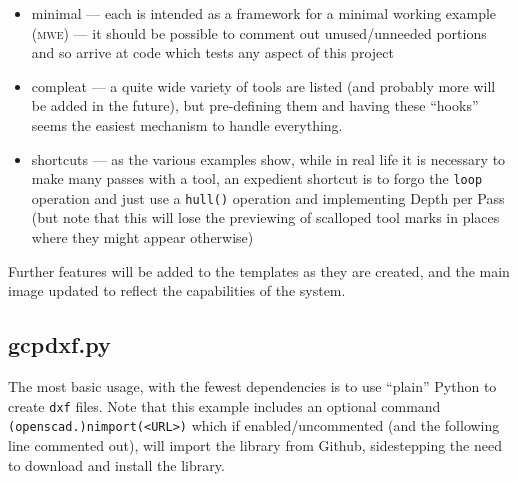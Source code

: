 \documentclass{ltxdoc}
\begin{document}
\begin{itemize}
\item minimal --- each is intended as a framework for a minimal working example (\textsc{mwe}) --- it should be possible to comment out unused/unneeded portions and so arrive at code which tests any aspect of this project
\item compleat --- a quite wide variety of tools are listed (and probably more will be
                   added in the future), but pre-defining them and having these ``hooks''
                   seems the easiest mechanism to handle everything. 
\item shortcuts --- as the various examples show, while in real life it is necessary to 
                    make many passes with a tool, an expedient shortcut is to forgo the 
                    \verb|loop| operation and just use a \verb|hull()| operation and implementing 
                    Depth per Pass (but note that this will lose the previewing of scalloped tool 
                    marks in places where they might appear otherwise)
\end{itemize}

Further features will be added to the templates as they are created, and the main image updated to reflect the capabilities of the system.

%
%
%
%
%

\subsection{gcpdxf.py}

The most basic usage, with the fewest dependencies is to use ``plain'' Python to create \verb|dxf| files. Note that this example includes an optional command \verb|(openscad.)nimport(<URL>)| which if enabled/uncommented (and the following line commented out), will import the library from Github, sidestepping the need to download and install the library.
\end{document}
